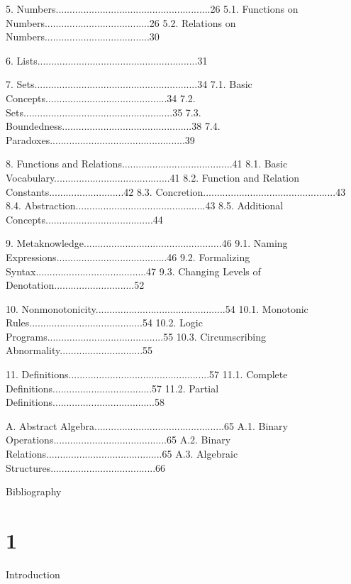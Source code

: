 5. Numbers........................................................26
   5.1. Functions on Numbers......................................26
   5.2. Relations on Numbers......................................30

6. Lists..........................................................31

7. Sets...........................................................34
   7.1. Basic Concepts............................................34
   7.2. Sets......................................................35
   7.3. Boundedness...............................................38
   7.4. Paradoxes.................................................39

8. Functions and Relations........................................41
   8.1. Basic Vocabulary..........................................41
   8.2. Function and Relation Constants...........................42
   8.3. Concretion................................................43
   8.4. Abstraction...............................................43
   8.5. Additional Concepts.......................................44

9. Metaknowledge..................................................46
   9.1. Naming Expressions........................................46
   9.2. Formalizing Syntax........................................47
   9.3. Changing Levels of Denotation.............................52

10. Nonmonotonicity...............................................54
    10.1. Monotonic Rules.........................................54
    10.2. Logic Programs..........................................55
    10.3. Circumscribing Abnormality..............................55

11. Definitions...................................................57
    11.1. Complete Definitions....................................57
    11.2. Partial Definitions.....................................58

A. Abstract Algebra...............................................65
   A.1. Binary Operations.........................................65
   A.2. Binary Relations..........................................65
   A.3. Algebraic Structures......................................66

Bibliography
\endverbatim

\vfill\eject

\chapter{1}{Introduction}

